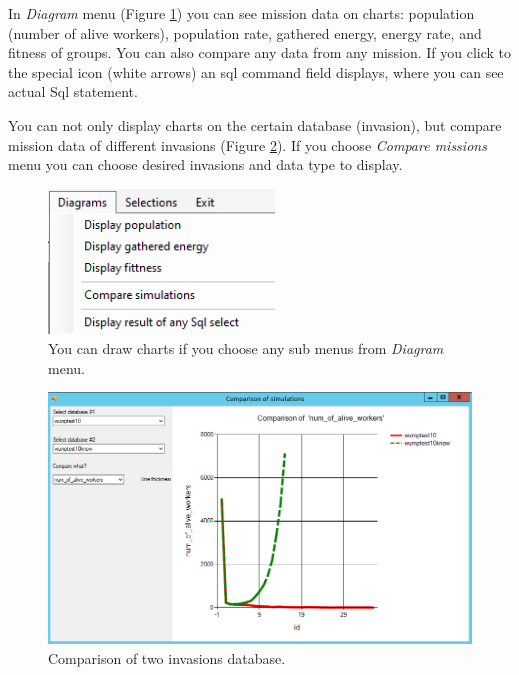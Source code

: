 \documentclass[a4paper,12pt]{article}
\begin{document}
In \textit{Diagram} menu (Figure \ref{fig:mnudiagrams}) you can see mission data on charts: population (number of alive workers), population rate, gathered energy, energy rate, and fitness of groups. You can also compare any data from any mission. If you click to the special icon (white arrows) an sql command field displays, where you can see actual Sql statement.

You can not only display charts on the certain database (invasion), but compare mission data of different invasions (Figure \ref{fig:comparison}). If you choose \textit{Compare missions} menu you can choose desired invasions and data type to display.

\begin{figure}
	\begin{center}
		\includegraphics[width=6cm]{mnudiagrams.png}
		\caption{You can draw charts if you choose any sub menus from \textit{Diagram} menu. }
		\label{fig:mnudiagrams}
	\end{center}
\end{figure}

\begin{figure}
	\begin{center}
		\includegraphics[width=15cm]{comparison.png}
		\caption{Comparison of two invasions database.}
		\label{fig:comparison}
	\end{center}
\end{figure}
		
\end{document}
